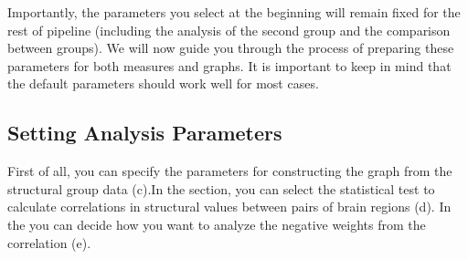 \documentclass[justified]{tufte-handout}
\begin{document}
Importantly, the parameters you select at the beginning will remain fixed for the rest of pipeline (including the analysis of the second group and the comparison between groups). We will now guide you through the process of preparing these parameters for both measures and graphs. It is important to keep in mind that the default parameters should work well for most cases.

\subsection{Setting Analysis Parameters}


First of all, you can specify the parameters for constructing the graph from the structural group data (c).In the  section, you can select the statistical test to calculate correlations in structural values between pairs of brain regions (d).
In the  you can decide how you want to analyze the negative weights from the correlation (e). 
\end{document}
